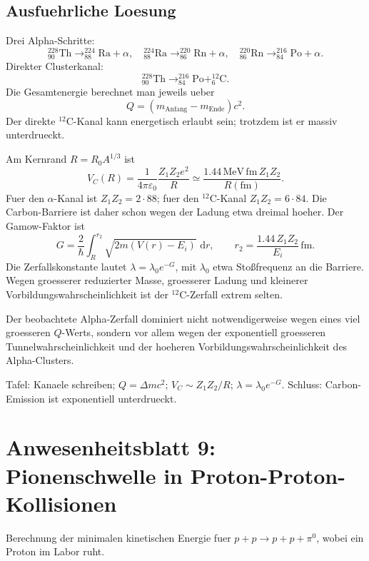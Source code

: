 \documentclass[11pt,a4paper]{scrartcl}
\newcommand{\dd}{\,\mathrm{d}}
\newcommand{\nuclide}[3]{^{#1}_{#2}\mathrm{#3}}
\begin{document}
\subsection{Ausfuehrliche Loesung}
\begin{calculationbox}[title={Reaktionskanaele}]
Drei Alpha-Schritte:
\[\nuclide{228}{90}{Th}\to\nuclide{224}{88}{Ra}+\alpha,\quad
\nuclide{224}{88}{Ra}\to\nuclide{220}{86}{Rn}+\alpha,\quad
\nuclide{220}{86}{Rn}\to\nuclide{216}{84}{Po}+\alpha.\]
Direkter Clusterkanal:
\[\nuclide{228}{90}{Th}\to\nuclide{216}{84}{Po}+\nuclide{12}{6}{C}.\]
Die Gesamtenergie berechnet man jeweils ueber
\[Q=(m_{\mathrm{Anfang}}-m_{\mathrm{Ende}})c^2.\]
Der direkte \(^{12}\mathrm C\)-Kanal kann energetisch erlaubt sein; trotzdem ist er massiv unterdrueckt.
\end{calculationbox}
\begin{calculationbox}[title={Coulombbarriere und Gamow-Faktor}]
Am Kernrand \(R=R_0A^{1/3}\) ist
\[V_C(R)=\frac{1}{4\pi\varepsilon_0}\frac{Z_1Z_2e^2}{R}\simeq \frac{1.44\,\mathrm{MeV\,fm}\,Z_1Z_2}{R(\mathrm{fm})}.\]
Fuer den \(\alpha\)-Kanal ist \(Z_1Z_2=2\cdot88\); fuer den \(^{12}\mathrm C\)-Kanal \(Z_1Z_2=6\cdot84\). Die Carbon-Barriere ist daher schon wegen der Ladung etwa dreimal hoeher. Der Gamow-Faktor ist
\[G=\frac{2}{\hbar}\int_R^{r_2}\sqrt{2m(V(r)-E_i)}\,\dd r,\qquad r_2=\frac{1.44\,Z_1Z_2}{E_i}\,\mathrm{fm}.\]
Die Zerfallskonstante lautet \(\lambda=\lambda_0e^{-G}\), mit \(\lambda_0\) etwa Stoßfrequenz an die Barriere. Wegen groesserer reduzierter Masse, groesserer Ladung und kleinerer Vorbildungswahrscheinlichkeit ist der \(^{12}\mathrm C\)-Zerfall extrem selten.
\end{calculationbox}
\begin{answerbox}Der beobachtete Alpha-Zerfall dominiert nicht notwendigerweise wegen eines viel groesseren \(Q\)-Werts, sondern vor allem wegen der exponentiell groesseren Tunnelwahrscheinlichkeit und der hoeheren Vorbildungswahrscheinlichkeit des Alpha-Clusters.\end{answerbox}
\begin{talkbox}Tafel: Kanaele schreiben; \(Q=\Delta mc^2\); \(V_C\sim Z_1Z_2/R\); \(\lambda=\lambda_0e^{-G}\). Schluss: Carbon-Emission ist exponentiell unterdrueckt.\end{talkbox}


\section{Anwesenheitsblatt 9: Pionenschwelle in Proton-Proton-Kollisionen}
\begin{taskbox}Berechnung der minimalen kinetischen Energie fuer \(p+p\to p+p+\pi^0\), wobei ein Proton im Labor ruht.\end{taskbox}
\end{document}
